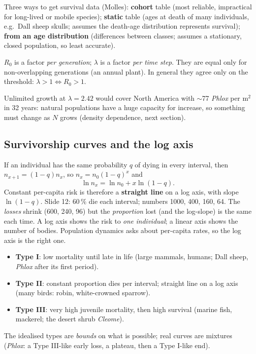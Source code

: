 Three ways to get survival data (Molles): \textbf{cohort} table (most reliable, impractical for long-lived or mobile
species); \textbf{static} table (ages at death of many individuals, e.g.\ Dall sheep skulls; assumes the death-age
distribution represents survival); \textbf{from an age distribution} (differences between classes; assumes a
stationary, closed population, so least accurate).

\begin{trap}
$R_0$ is a factor \emph{per generation}; $\lambda$ is a factor \emph{per time step}. They are equal only for
non-overlapping generations (an annual plant). In general they agree only on the threshold: $\lambda>1\iff R_0>1$.
\end{trap}

Unlimited growth at $\lambda=2.42$ would cover North America with $\sim$77 \emph{Phlox} per m$^2$ in 32 years:
natural populations have a huge capacity for increase, so something must change as $N$ grows (density dependence,
next section).

\subsection{Survivorship curves and the log axis}
\begin{chain}
If an individual has the same probability $q$ of dying in every interval, then $n_{x+1}=(1-q)n_x$, so
$n_x=n_0(1-q)^x$ and
\[
\ln n_x=\ln n_0+x\ln(1-q).
\]
Constant per-capita risk is therefore a \textbf{straight line} on a log axis, with slope $\ln(1-q)$. Slide 12: 60\,\%
die each interval; numbers 1000, 400, 160, 64. The \emph{losses} shrink (600, 240, 96) but the \emph{proportion}
lost (and the log-slope) is the same each time. A log axis shows the risk to \emph{one individual}; a linear axis
shows the number of bodies. Population dynamics asks about per-capita rates, so the log axis is the right one.
\end{chain}

\begin{itemize}
\item \textbf{Type I}: low mortality until late in life (large mammals, humans; Dall sheep, \emph{Phlox} after its
first period).
\item \textbf{Type II}: constant proportion dies per interval; straight line on a log axis (many birds: robin,
white-crowned sparrow).
\item \textbf{Type III}: very high juvenile mortality, then high survival (marine fish, mackerel; the desert shrub
\emph{Cleome}).
\end{itemize}
The idealised types are \emph{bounds} on what is possible; real curves are mixtures (\emph{Phlox}: a Type III-like
early loss, a plateau, then a Type I-like end).

